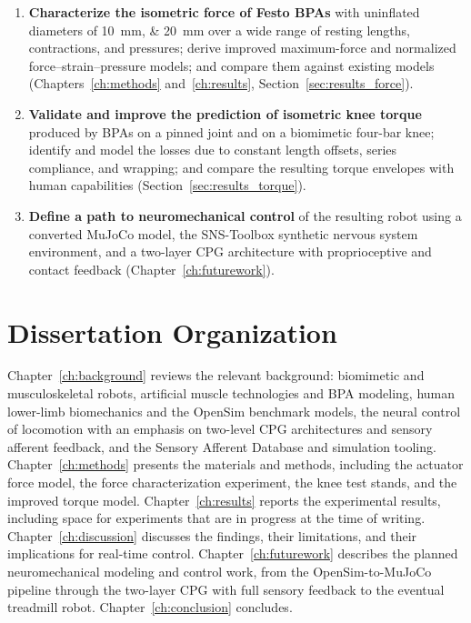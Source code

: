 \begin{enumerate}
    \item \textbf{Characterize the isometric force of Festo BPAs} with uninflated diameters of \qtylist{10;20}{\mm} over a wide range of resting lengths, contractions, and pressures; derive improved maximum-force and normalized force--strain--pressure models; and compare them against existing models (Chapters~\ref{ch:methods} and~\ref{ch:results}, Section~\ref{sec:results_force}).
    \item \textbf{Validate and improve the prediction of isometric knee torque} produced by BPAs on a pinned joint and on a biomimetic four-bar knee; identify and model the losses due to constant length offsets, series compliance, and wrapping; and compare the resulting torque envelopes with human capabilities (Section~\ref{sec:results_torque}).
    \item \textbf{Define a path to neuromechanical control} of the resulting robot using a converted MuJoCo model, the SNS-Toolbox synthetic nervous system environment, and a two-layer CPG architecture with proprioceptive and contact feedback (Chapter~\ref{ch:futurework}).
\end{enumerate}

\section{Dissertation Organization}\label{sec:organization}

Chapter~\ref{ch:background} reviews the relevant background: biomimetic and musculoskeletal robots, artificial muscle technologies and BPA modeling, human lower-limb biomechanics and the OpenSim benchmark models, the neural control of locomotion with an emphasis on two-level CPG architectures and sensory afferent feedback, and the Sensory Afferent Database and simulation tooling. Chapter~\ref{ch:methods} presents the materials and methods, including the actuator force model, the force characterization experiment, the knee test stands, and the improved torque model. Chapter~\ref{ch:results} reports the experimental results, including space for experiments that are in progress at the time of writing. Chapter~\ref{ch:discussion} discusses the findings, their limitations, and their implications for real-time control. Chapter~\ref{ch:futurework} describes the planned neuromechanical modeling and control work, from the OpenSim-to-MuJoCo pipeline through the two-layer CPG with full sensory feedback to the eventual treadmill robot. Chapter~\ref{ch:conclusion} concludes.
